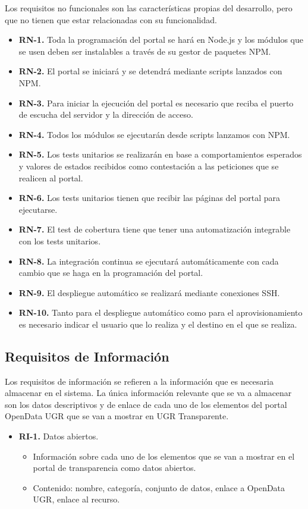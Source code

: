 Los requisitos no funcionales son las características propias del desarrollo, pero que no tienen que estar relacionadas con su funcionalidad.

\begin{itemize}
  \item \textbf{RN-1.} Toda la programación del portal se hará en Node.js y los módulos que se usen deben ser instalables a través de su gestor de paquetes NPM.
  \item \textbf{RN-2.} El portal se iniciará y se detendrá mediante scripts lanzados con NPM.
  \item \textbf{RN-3.} Para iniciar la ejecución del portal es necesario que reciba el puerto de escucha del servidor y la dirección de acceso.
  \item \textbf{RN-4.} Todos los módulos se ejecutarán desde scripts lanzamos con NPM.
  \item \textbf{RN-5.} Los tests unitarios se realizarán en base a comportamientos esperados y valores de estados
  recibidos como contestación a las peticiones que se realicen al portal.
  \item \textbf{RN-6.} Los tests unitarios tienen que recibir las páginas del portal para ejecutarse.
  \item \textbf{RN-7.} El test de cobertura tiene que tener una automatización integrable con los tests unitarios. 
  \item \textbf{RN-8.} La integración continua se ejecutará automáticamente con cada cambio que se haga en la programación del portal.
  \item \textbf{RN-9.} El despliegue automático se realizará mediante conexiones SSH.
  \item \textbf{RN-10.} Tanto para el despliegue automático como para el aprovisionamiento es necesario indicar el usuario que lo realiza y el destino en el que se realiza.
\end{itemize}

\subsection{Requisitos de Información}

Los requisitos de información se refieren a la información que es necesaria almacenar en el sistema. La única información relevante que se va a almacenar son los datos descriptivos y de enlace de cada uno de los elementos del portal OpenData UGR que se van a mostrar en UGR Transparente.

\begin{itemize}
  \item \textbf{RI-1.} Datos abiertos.
  \begin{itemize}
    \item Información sobre cada uno de los elementos que se van a mostrar en el portal de transparencia como datos abiertos.
    \item Contenido: nombre, categoría, conjunto de datos, enlace a OpenData UGR, enlace al recurso.
  \end{itemize}
\end{itemize}

